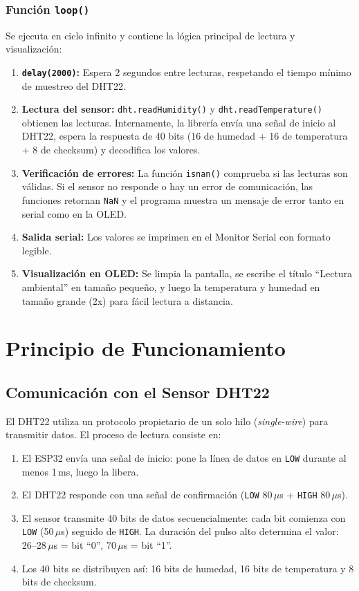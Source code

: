 \documentclass[12pt,a4paper]{article}
\begin{document}
\subsubsection*{Función \texttt{loop()}}
Se ejecuta en ciclo infinito y contiene la lógica principal de lectura y visualización:

\begin{enumerate}
    \item \textbf{\texttt{delay(2000)}:} Espera 2 segundos entre lecturas, respetando el tiempo mínimo de muestreo del DHT22.
    \item \textbf{Lectura del sensor:} \texttt{dht.readHumidity()} y \texttt{dht.readTemperature()} obtienen las lecturas. Internamente, la librería envía una señal de inicio al DHT22, espera la respuesta de 40 bits (16 de humedad + 16 de temperatura + 8 de checksum) y decodifica los valores.
    \item \textbf{Verificación de errores:} La función \texttt{isnan()} comprueba si las lecturas son válidas. Si el sensor no responde o hay un error de comunicación, las funciones retornan \texttt{NaN} y el programa muestra un mensaje de error tanto en serial como en la OLED.
    \item \textbf{Salida serial:} Los valores se imprimen en el Monitor Serial con formato legible.
    \item \textbf{Visualización en OLED:} Se limpia la pantalla, se escribe el título ``Lectura ambiental'' en tamaño pequeño, y luego la temperatura y humedad en tamaño grande (2x) para fácil lectura a distancia.
\end{enumerate}

\section{Principio de Funcionamiento}

\subsection{Comunicación con el Sensor DHT22}
El DHT22 utiliza un protocolo propietario de un solo hilo (\textit{single-wire}) para transmitir datos. El proceso de lectura consiste en:

\begin{enumerate}
    \item El ESP32 envía una señal de inicio: pone la línea de datos en \texttt{LOW} durante al menos 1\,ms, luego la libera.
    \item El DHT22 responde con una señal de confirmación (\texttt{LOW} 80\,$\mu$s + \texttt{HIGH} 80\,$\mu$s).
    \item El sensor transmite 40 bits de datos secuencialmente: cada bit comienza con \texttt{LOW} (50\,$\mu$s) seguido de \texttt{HIGH}. La duración del pulso alto determina el valor: 26--28\,$\mu$s = bit ``0'', 70\,$\mu$s = bit ``1''.
    \item Los 40 bits se distribuyen así: 16 bits de humedad, 16 bits de temperatura y 8 bits de checksum.
\end{enumerate}
\end{document}
